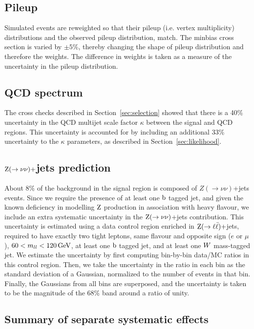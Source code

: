 \subsection{Pileup} 
Simulated events are reweighted so that their pileup (i.e.  vertex
multiplicity)
distributions  and the observed pileup distribution,  match. The minbias cross section is varied by
$\pm 5\%$, thereby changing the shape of pileup distribution and therefore the weights.  The
difference in weights is taken as a measure of the uncertainty in the pileup distribution.  

\subsection{QCD spectrum} 
The cross checks described in Section~\ref{sec:selection}
showed that
there is a 40\% uncertainty in the QCD multijet scale factor $\kappa$ between the signal and QCD
regions.  This uncertainty is accounted for by including an additional 33\% uncertainty to the
$\kappa$
parameters, as described in Section~\ref{sec:likelihood}.

\subsection{$\mathrm{Z} (\rightarrow \nu \nu)+$jets prediction} 
About 8\% of the background in
the signal
region is composed of $Z(\rightarrow\nu\nu)$+jets events. Since we require the presence of at least
one $\mathrm{b}$ tagged jet, and given the known deficiency in modelling $\mathrm{Z}$ production in association
with heavy flavour, we include an extra systematic uncertainty in the $\mathrm{Z}(\rightarrow\nu\nu)$+jets
contribution.  This uncertainty is estimated using a data control region enriched in
$\mathrm{Z}(\rightarrow \ell \bar{\ell})+$jets, required to have exactly two tight leptons, same flavour
and opposite sign ($e$ or $\mu$), $60 < m_{ll} < 120\,\text{Ge\hspace{-.08em}V}$, at least one $\mathrm{b}$ tagged jet, and at
least one $W$ mass-tagged jet.  We estimate the uncertainty by first computing bin-by-bin data/MC
ratios in this control region.  Then, we take the uncertainty in the ratio in each bin as the
standard deviation of a Gaussian, normalized to  the number of events in that bin.  Finally, the
Gaussians from all bins are superposed, and the 
uncertainty is taken to be the magnitude of the 68\% band around a ratio of unity.

\subsection{Summary of separate systematic effects}

